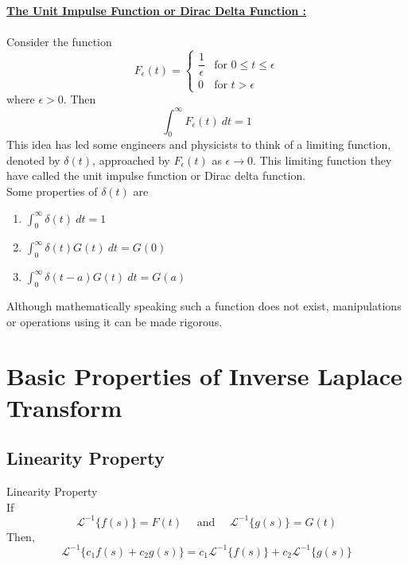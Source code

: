 \documentclass[12pt]{article}
\newcommand{\Lapinv}{\mathscr{L}^{-1}}
\begin{document}
\begin{note}{}
    \underline{\textbf{The Unit Impulse Function or Dirac Delta Function :}}\\~\\
    Consider the function \[
        F_\epsilon(t) = 
        \begin{cases}
            \dfrac{1}{\epsilon} & \text{for } 0 \le t \le \epsilon \\
            0 & \text{for } t > \epsilon
        \end{cases}
    \] where $\epsilon > 0$. Then \[
        \int_{0}^{\infty} {F_\epsilon(t)} \: d{t} = 1
    \] This idea has led some engineers and physicists to think of a limiting function, denoted by $\delta(t)$, approached by $F_{\epsilon}(t)$ as $\epsilon \to 0$. This limiting function they have called the unit impulse function or Dirac delta function.\\
    Some properties of $\delta(t)$ are
    \begin{enumerate}
        \item $\displaystyle \int_{0}^{\infty} {\delta(t)} \: d{t} = 1$ \\
        \item $\displaystyle \int_{0}^{\infty} {\delta(t)G(t)} \: d{t} = G(0)$ \\
        \item $\displaystyle \int_{0}^{\infty} {\delta(t-a)G(t)} \: d{t} = G(a)$
    \end{enumerate}
    Although mathematically speaking such a function does not exist, manipulations or operations using it can be made rigorous.
\end{note}


\section{Basic Properties of Inverse Laplace Transform}

\subsection{Linearity Property}

\begin{theorem}{Linearity Property}{}
    \\If \[
        \Lapinv \{ f(s) \} = F(t) \quad \text{ and } \quad
        \Lapinv \{ g(s) \} = G(t)
    \] Then, \[
        \Lapinv \{ c_1f(s) + c_2g(s) \} = c_1 \Lapinv \{ f(s) \} + c_2 \Lapinv \{ g(s) \}
    \]
\end{theorem}
\end{document}
